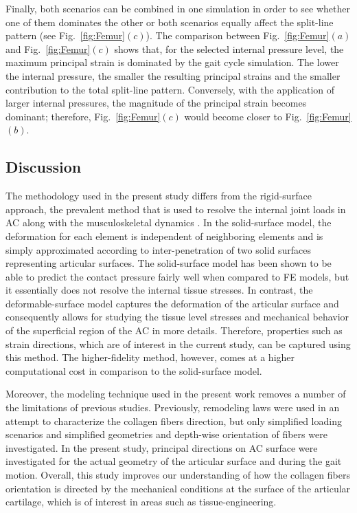 Finally, both scenarios can be combined in one simulation in order to see whether one of them dominates the other or both scenarios equally affect the split-line pattern (see Fig.~\ref{fig:Femur}$(c)$). The comparison between Fig.~\ref{fig:Femur}$(a)$ and Fig.~\ref{fig:Femur}$(c)$ shows that, for the selected internal pressure level, the maximum principal strain is dominated by the gait cycle simulation. The lower the internal pressure, the smaller the resulting principal strains and the smaller contribution to the total split-line pattern. Conversely, with the application of larger internal pressures, the magnitude of the principal strain becomes dominant; therefore, Fig.~\ref{fig:Femur}$(c)$ would become closer to Fig.~\ref{fig:Femur}$(b)$.\\


\subsection{Discussion}
\label{sec:AC-Discussion}
The methodology used in the present study differs from the rigid-surface approach, the prevalent method that is used to resolve the internal joint loads in AC along with the musculoskeletal dynamics \cite{Smith2016,Lenhart2015,Marra2015,Guess2013}. In the solid-surface model, the deformation for each element is independent of neighboring elements and is simply approximated according to inter-penetration of two solid surfaces representing articular surfaces. The solid-surface model has been shown \cite{Guess2013,abraham2013} to be able to predict the contact pressure fairly well when compared to FE models, but it essentially does not resolve the internal tissue stresses. In contrast, the deformable-surface model captures the deformation of the articular surface and consequently allows for studying the tissue level stresses and mechanical behavior of the superficial region of the AC in more details. Therefore, properties such as strain directions, which are of interest in the current study, can be captured using this method. The higher-fidelity method, however, comes at a higher computational cost in comparison to the solid-surface model.

Moreover, the modeling technique used in the present work removes a number of the limitations of previous studies.  Previously, remodeling laws were used in an attempt to characterize the collagen fibers direction, but only simplified loading scenarios and simplified geometries \cite{Wilson2006} and depth-wise orientation of fibers \cite{Cortez2016} were investigated. In the present study, principal directions on AC surface were investigated for the actual geometry of the articular surface and during the gait motion. Overall, this study improves our understanding of how the collagen fibers orientation is directed by the mechanical conditions at the surface of the articular cartilage, which is of interest in areas such as tissue-engineering.

